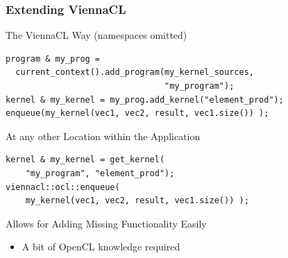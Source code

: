 \begin{frame}[fragile]
\frametitle{Extending ViennaCL}

\begin{block}{The ViennaCL Way (namespaces omitted)}
  {\black \begin{lstlisting}
program & my_prog = 
  current_context().add_program(my_kernel_sources, 
                                "my_program");
kernel & my_kernel = my_prog.add_kernel("element_prod");
enqueue(my_kernel(vec1, vec2, result, vec1.size()) );
  \end{lstlisting} }
\end{block}

\begin{block}{At any other Location within the Application}
  {\black \begin{lstlisting}
kernel & my_kernel = get_kernel(
    "my_program", "element_prod");
viennacl::ocl::enqueue(
    my_kernel(vec1, vec2, result, vec1.size()) );
  \end{lstlisting} }
\end{block}

  \begin{block}{Allows for Adding Missing Functionality Easily}
    \begin{itemize}
     \item A bit of OpenCL knowledge required
    \end{itemize}
  \end{block}

\end{frame}



